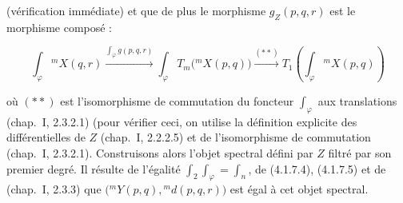 (vérification immédiate) et que de plus le morphisme $g_Z(p,q,r)$ est le
morphisme composé :

\begin{equation}
\int_\varphi{}^{m}\!X(q,r)
\xrightarrow{\int_\varphi g(p,q,r)}
\int_\varphi T_m\bigl({}^{m}\!X(p,q)\bigr)
\xrightarrow{(**)}
T_1\left(\int_\varphi{}^{m}\!X(p,q)\right)
\tag{4.1.7.5}
\end{equation}

où $(**)$ est l'isomorphisme de commutation du foncteur $\int_\varphi$ aux
translations (chap.~I, 2.3.2.1) (pour vérifier ceci, on utilise la définition
explicite des différentielles de $Z$ (chap.~I, 2.2.2.5) et de l'isomorphisme
de commutation (chap.~I, 2.3.2.1). Construisons alors l'objet spectral défini
par $Z$ filtré par son premier degré. Il résulte de l'égalité
$\int_2\int_\varphi=\int_n$, de (4.1.7.4), (4.1.7.5) et de
(chap.~I, 2.3.3) que
$\bigl({}^{m}\!Y(p,q),{}^{m}\!d(p,q,r)\bigr)$ est égal à cet objet
spectral.
\endgroup
